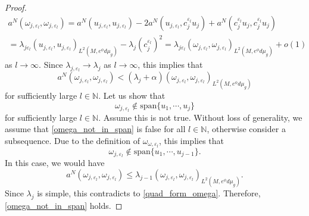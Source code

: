 \documentclass[12pt,a4paper]{amsart}
\numberwithin{equation}{section}
\theoremstyle{plain}
\theoremstyle{definition}
\begin{document}
\begin{proof}
\begin{multline}
        a^N(\omega_{j,\varepsilon_l} , \omega_{j,\varepsilon_l} ) = a^N (u_{j,\varepsilon_l}, u_{j,\varepsilon_l}) - 2 a^N (u_{j,\varepsilon_l}, c_j^{\varepsilon_l}u_j) + a^N (c_j^{\varepsilon_l}u_j, c_j^{\varepsilon_l}u_j)\\
        = \lambda_{j\varepsilon_l} (u_{j,\varepsilon_l}, u_{j,\varepsilon_l})_{L^2(M,e^\phi d\mu_g)} - \lambda_j(c_j^{\varepsilon_l})^2 = \lambda_{j\varepsilon_l} (\omega_{j,\varepsilon_l}, \omega_{j,\varepsilon_l})_{L^2(M,e^\phi d\mu_g)} + o(1)
    \end{multline}
    as $l\rightarrow\infty$. Since $\lambda_{j,\varepsilon_l} \rightarrow \lambda_j$ as $l\rightarrow \infty$, this implies that
    \begin{equation*}
		a^N(\omega_{j,\varepsilon_l} , \omega_{j,\varepsilon_l} )  < (\lambda_j + \alpha)  (\omega_{j,\varepsilon_l} , \omega_{j,\varepsilon_l} )_{L^2(M,e^\phi d\mu_g)}
    \end{equation*}
    for sufficiently large $l\in \mathbb{N}$. Let us show that 
    \begin{equation}\label{omega_not_in_span}
		\omega_{j,\varepsilon_l} \notin \text{span}\{u_1,\cdots,u_j\}
    \end{equation}
    for sufficiently large $l\in \mathbb{N}$. Assume this is not true. Without loss of generality, we assume that \eqref{omega_not_in_span} is false for all $l\in \mathbb N$, otherwise consider a subsequence. Due to the definition of $\omega_{\omega,\varepsilon_l}$, this implies that
    \begin{equation*}
		\omega_{j,\varepsilon_l} \notin \text{span}\{u_1,\cdots,u_{j-1}\}.
    \end{equation*}
    In this case, we would have
    \begin{equation*}
        a^N(\omega_{j,\varepsilon_l} , \omega_{j,\varepsilon_l} ) \leq \lambda_{j-1}(\omega_{j,\varepsilon_l} , \omega_{j,\varepsilon_l} )_{L^2(M,e^\phi d\mu_g)}.
    \end{equation*}
    Since $\lambda_j$ is simple, this contradicts to \eqref{quad_form_omega}. Therefore, \eqref{omega_not_in_span} holds.
    

\end{proof}
\end{document}
